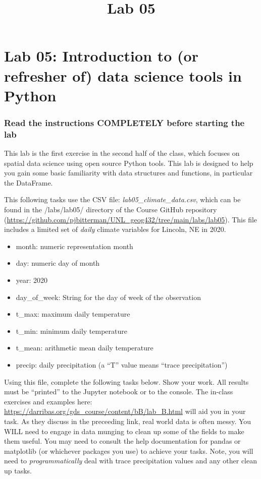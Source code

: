 \documentclass[]{article}
\title{Lab 05}
\author{}
\date{}
\makeatletter
\providecommand{\tightlist}{%
  \setlength{\itemsep}{0pt}\setlength{\parskip}{0pt}}
\renewcommand{\maketitle}{\bgroup\vspace*{-1cm}\setlength{\parindent}{0pt}
\begin{flushleft}
  \@author
  
  \@date
  
\end{flushleft}\egroup
}
\makeatother
\begin{document}
\maketitle

\hypertarget{lab-05-introduction-to-or-refresher-of-data-science-tools-in-python}{%
\section{Lab 05: Introduction to (or refresher of) data science tools in
Python}\label{lab-05-introduction-to-or-refresher-of-data-science-tools-in-python}}

\hypertarget{read-the-instructions-completely-before-starting-the-lab}{%
\subsubsection{Read the instructions COMPLETELY before starting the
lab}\label{read-the-instructions-completely-before-starting-the-lab}}

This lab is the first exercise in the second half of the class, which
focuses on spatial data science using open source Python tools. This lab
is designed to help you gain some basic familiarity with data structures
and functions, in particular the DataFrame.

This following tasks use the CSV file: \emph{lab05\_climate\_data.csv},
which can be found in the /labs/lab05/ directory of the Course GitHub
repository
(\url{https://github.com/pjbitterman/UNL_geog432/tree/main/labs/lab05}).
This file includes a limited set of \emph{daily} climate variables for
Lincoln, NE in 2020.

\begin{itemize}
\tightlist
\item
  month: numeric representation month
\item
  day: numeric day of month
\item
  year: 2020
\item
  day\_of\_week: String for the day of week of the observation
\item
  t\_max: maximum daily temperature
\item
  t\_min: minimum daily temperature
\item
  t\_mean: arithmetic mean daily temperature
\item
  precip: daily precipitation (a ``T'' value means ``trace
  precipitation'')
\end{itemize}

Using this file, complete the following tasks below. Show your work. All
results must be ``printed'' to the Jupyter notebook or to the console.
The in-class exercises and examples here:
\url{https://darribas.org/gds_course/content/bB/lab_B.html} will aid you
in your task. As they discuss in the preceeding link, real world data is
often messy. You WILL need to engage in data munging to clean up some of
the fields to make them useful. You may need to consult the help
documentation for pandas or matplotlib (or whichever packages you use)
to achieve your tasks. Note, you will need to \emph{programmatically}
deal with trace precipitation values and any other clean up tasks.
\end{document}

